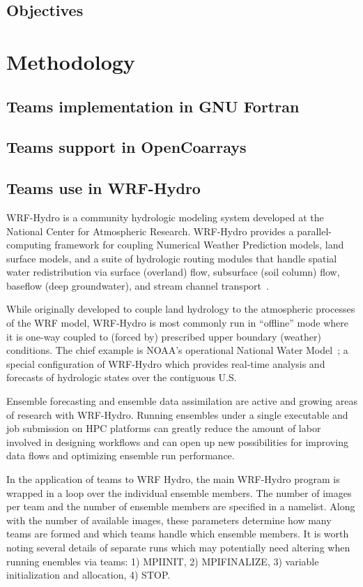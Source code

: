 \subsection{Objectives}

\section{Methodology}
\subsection{Teams implementation in GNU Fortran}
\subsection{Teams support in OpenCoarrays}
\subsection{Teams use in WRF-Hydro}

WRF-Hydro is a community hydrologic modeling system developed at the
National Center for Atmospheric Research.  WRF-Hydro provides a
parallel-computing framework for coupling Numerical Weather Prediction models, land surface models, and a suite of hydrologic routing modules that handle
spatial water redistribution via surface (overland) flow,
subsurface (soil column) flow, baseflow (deep groundwater), and stream
channel transport~\cite{gochisEtal}. 

While originally developed to couple land hydrology to the atmospheric processes of
the WRF model, WRF-Hydro is most commonly run in ``offline'' mode where it is one-way
coupled to (forced by) prescribed upper boundary (weather)
conditions. The chief example is NOAA's operational
National Water Model~\cite{noaa2016}; a special configuration of
WRF-Hydro which provides real-time analysis and forecasts of
hydrologic states over the contiguous U.S. 

Ensemble forecasting and ensemble data assimilation are active and
growing areas of research with WRF-Hydro. Running ensembles under a
single executable and job submission on HPC platforms can greatly reduce the amount
of labor involved in designing workflows and can open up new
possibilities for improving data flows and optimizing ensemble run
performance.

In the application of teams to WRF Hydro, the main WRF-Hydro program is wrapped in a loop
over the individual ensemble members. The number of images per team and the
 number of ensemble members are specified in a namelist. Along  with
 the number of available images, these parameters determine how many
 teams are formed and which teams handle which ensemble members. It is
 worth noting several details of separate runs which may potentially need altering
 when running enembles via teams: 1) MPIINIT, 2) MPIFINALIZE, 3)
 variable initialization and allocation, 4) STOP.   
 

